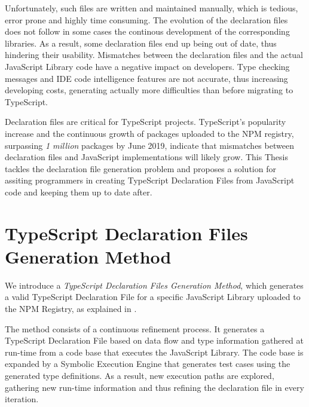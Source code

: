 Unfortunately, such files are written and maintained manually, which is tedious, error prone and highly time consuming. The evolution of the declaration files does not follow in some cases the continous development of the corresponding libraries. As a result, some declaration files end up being out of date, thus hindering their usability. Mismatches between the declaration files and the actual JavaScript Library code have a negative impact on developers. Type checking messages and IDE code intelligence features are not accurate, thus increasing developing costs, generating actually more difficulties than before migrating to TypeScript.

Declaration files are critical for TypeScript projects. TypeScript's popularity increase and the continuous growth of packages uploaded to the NPM registry, surpassing \textit{1 million} packages by June 2019, indicate that mismatches between declaration files and JavaScript implementations will likely grow. This Thesis tackles the declaration file generation problem and proposes a solution for assiting programmers in creating TypeScript Declaration Files from JavaScript code and keeping them up to date after.


\section{TypeScript Declaration Files Generation Method}

We introduce a \textit{TypeScript Declaration Files Generation Method}, which generates a valid TypeScript Declaration File for a specific JavaScript Library uploaded to the NPM Registry, as explained in .



The method consists of a continuous refinement process. It generates a TypeScript Declaration File based on data flow and type information gathered at run-time from a code base that executes the JavaScript Library. The code base is expanded by a Symbolic Execution Engine that generates test cases using the generated type definitions. As a result, new execution paths are explored, gathering new run-time information and thus refining the declaration file in every iteration.

